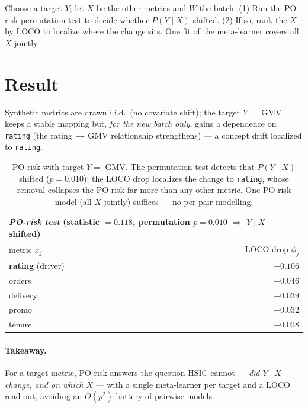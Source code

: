 \documentclass[11pt]{article}
\begin{document}
Choose a target $Y$; let $X$ be the other metrics and $W$ the batch. (1) Run the
PO-risk permutation test to decide whether $P(Y\mid X)$ shifted. (2) If so, rank
the $X$ by LOCO to localize where the change sits. One fit of the meta-learner
covers all $X$ jointly.

\section{Result}

Synthetic metrics are drawn i.i.d.\ (no covariate shift); the target $Y=$ GMV
keeps a stable mapping but, \emph{for the new batch only}, gains a dependence on
\texttt{rating} (the rating\,$\to$\,GMV relationship strengthens) --- a concept
drift localized to \texttt{rating}.

\begin{table}[h]
\centering
\begin{tabular}{lr}
\toprule
\multicolumn{2}{l}{\emph{PO-risk test} \;(statistic $=0.118$, permutation $p=0.010$ $\Rightarrow$ $Y\mid X$ shifted)}\\
\midrule
metric $x_j$ & LOCO drop $\phi_j$ \\
\midrule
\textbf{rating} \;(driver) & $\mathbf{+0.106}$ \\
orders   & $+0.046$ \\
delivery & $+0.039$ \\
promo    & $+0.032$ \\
tenure   & $+0.028$ \\
\bottomrule
\end{tabular}
\caption{PO-risk with target $Y=$ GMV. The permutation test detects that
$P(Y\mid X)$ shifted ($p=0.010$); the LOCO drop localizes the change to
\texttt{rating}, whose removal collapses the PO-risk far more than any other
metric. One PO-risk model (all $X$ jointly) suffices --- no per-pair modelling.}
\end{table}

\paragraph{Takeaway.} For a target metric, PO-risk answers the question HSIC
cannot --- \emph{did $Y\mid X$ change, and on which $X$} --- with a single
meta-learner per target and a LOCO read-out, avoiding an $O(p^2)$ battery of
pairwise models.
\end{document}
